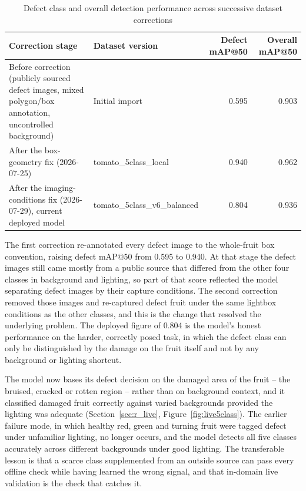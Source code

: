 \begin{table}[H]
\caption{Defect class and overall detection performance across successive dataset corrections}
\label{tab:corrections}
\centering
\begin{tabularx}{\textwidth}{p{4.6cm} p{3.0cm} r r}
\toprule
\textbf{Correction stage} & \textbf{Dataset version} & \textbf{Defect mAP@50} & \textbf{Overall mAP@50} \\
\midrule
Before correction (publicly sourced defect images, mixed polygon/box annotation, uncontrolled background) & Initial import & 0.595 & 0.903 \\
After the box-geometry fix (2026-07-25) & tomato\_5class\_local & 0.940 & 0.962 \\
After the imaging-conditions fix (2026-07-29), current deployed model & tomato\_5class\_v6\_balanced & 0.804 & 0.936 \\
\bottomrule
\end{tabularx}
\end{table}

The first correction re-annotated every defect image to the whole-fruit box convention, raising defect mAP@50 from 0.595 to 0.940. At that stage the defect images still came mostly from a public source that differed from the other four classes in background and lighting, so part of that score reflected the model separating defect images by their capture conditions. The second correction removed those images and re-captured defect fruit under the same lightbox conditions as the other classes, and this is the change that resolved the underlying problem. The deployed figure of 0.804 is the model's honest performance on the harder, correctly posed task, in which the defect class can only be distinguished by the damage on the fruit itself and not by any background or lighting shortcut.

The model now bases its defect decision on the damaged area of the fruit -- the bruised, cracked or rotten region -- rather than on background context, and it classified damaged fruit correctly against varied backgrounds provided the lighting was adequate (Section~\ref{sec:r_live}, Figure~\ref{fig:live5class}). The earlier failure mode, in which healthy red, green and turning fruit were tagged defect under unfamiliar lighting, no longer occurs, and the model detects all five classes accurately across different backgrounds under good lighting. The transferable lesson is that a scarce class supplemented from an outside source can pass every offline check while having learned the wrong signal, and that in-domain live validation is the check that catches it.


